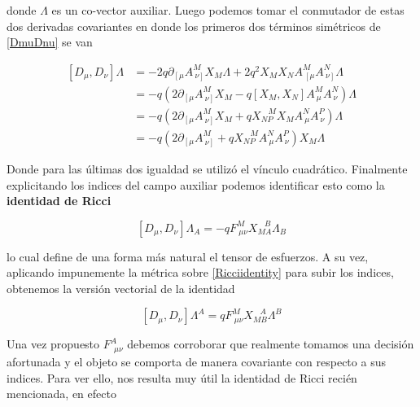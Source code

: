 \documentclass{article}
\numberwithin{equation}{section}
\begin{document}
donde $ \Lambda $ es un co-vector auxiliar. Luego podemos tomar el conmutador de estas dos derivadas covariantes en donde los primeros dos términos simétricos de \ref{DmuDnu} se van

\begin{equation}
\begin{aligned}
\left[D_{\mu}, D_{\nu}\right] \Lambda &= -2 q  \partial_{\left[ \mu\right.} A^M_{\ \left. \nu \right]} X_M \Lambda + 2 q^2 X_M X_N A^M_{\ \left[ \mu \right.} A^N_{\ \left. \nu\right]} \Lambda\\
&= -q \left( 2 \partial_{\left[ \mu\right.} A^M_{\ \left. \nu \right]} X_M  - q \left[X_M, X_N\right] A^M_{\ \mu} A^N_{\ \nu} \right) \Lambda\\
&= -q \left( 2 \partial_{\left[ \mu\right.} A^M_{\ \left. \nu \right]} X_M + q X_{N P}^{\ \ \ \ M} X_M A^N_{\ \mu} A^P_{\ \nu} \right)  \Lambda\\
&=-q \left( 2 \partial_{\left[ \mu\right.} A^M_{\ \left. \nu \right]} + q X_{N P}^{\ \ \ \ M}  A^N_{\ \mu} A^P_{\ \nu} \right) X_M \Lambda
\end{aligned}
\end{equation}

Donde para las últimas dos igualdad se utilizó el vínculo cuadrático. Finalmente explicitando los indices del campo auxiliar podemos identificar esto como la \textbf{identidad de Ricci}

\begin{boxquation}
\begin{equation}\label{Ricciidentity}
\left[D_{\mu}, D_{\nu}\right] \Lambda_A = -q F^M_{\ \mu \nu} X_{M A}^{\ \ \ \ B} \Lambda_B 
\end{equation}
\end{boxquation}

lo cual define de una forma más natural el tensor de esfuerzos. A su vez, aplicando impunemente la métrica sobre \ref{Ricciidentity} para subir los indices, obtenemos la versión vectorial de la identidad

\begin{equation}\label{Ricciidentityvectorial}
\left[D_{\mu}, D_{\nu}\right] \Lambda^A = q F^M_{\ \mu \nu} X_{M B}^{\ \ \ \ A} \Lambda^B
\end{equation}

Una vez propuesto $ F^A_{\ \  \mu \nu} $ debemos corroborar que realmente tomamos una decisión afortunada y el objeto se comporta de manera covariante con respecto a sus indices. Para ver ello, nos resulta muy útil la identidad de Ricci recién mencionada, en efecto
\end{document}
